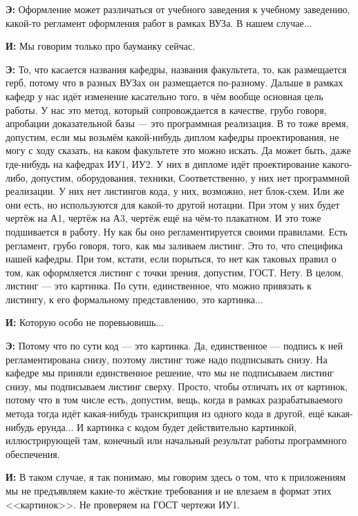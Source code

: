 \textbf{Э: }Оформление может различаться от учебного заведения к учебному заведению, какой-то регламент оформления работ в рамках ВУЗа. В нашем случае...

\textbf{И: }Мы говорим только про бауманку сейчас.

\textbf{Э: }То, что касается названия кафедры, названия факультета, то, как размещается герб, потому что в разных ВУЗах он размещается по-разному. Дальше в рамках кафедр у нас идёт изменение касательно того, в чём вообще основная цель работы. У нас это метод, который сопровождается в качестве, грубо говоря, апробации доказательной базы --- это программная реализация. В то тоже время, допустим, если мы возьмём какой-нибудь диплом кафедры проектирования, не могу с ходу сказать, на каком факультете это можно искать. Да может быть, даже где-нибудь на кафедрах ИУ1, ИУ2. У них в дипломе идёт проектирование какого-либо, допустим, оборудования, техники, Соответственно, у них нет программной реализации. У них нет листингов кода, у них, возможно, нет блок-схем. Или же они есть, но используются для какой-то другой нотации. При этом у них будет чертёж на А1, чертёж на А3, чертёж ещё на чём-то плакатном. И это тоже подшивается в работу. Ну как бы оно регламентируется своими правилами. Есть регламент, грубо говоря, того, как мы заливаем листинг. Это то, что специфика нашей кафедры. При том, кстати, если порыться, то нет как таковых правил о том, как оформляется листинг с точки зрения, допустим, ГОСТ. Нету. В целом, листинг --- это картинка. По сути, единственное, что можно привязать к листингу, к его формальному представлению, это картинка...

\textbf{И: }Которую особо не поревьювишь...

\textbf{Э: }Потому что по сути код --- это картинка. Да, единственное --- подпись к ней регламентирована снизу, поэтому листинг тоже надо подписывать снизу. На кафедре мы приняли единственное решение, что мы не подписываем листинг снизу, мы подписываем листинг сверху. Просто, чтобы отличать их от картинок, потому что в том числе есть, допустим, вещь, когда в рамках разрабатываемого метода тогда идёт какая-нибудь транскрипция из одного кода в другой, ещё какая-нибудь ерунда... И картинка с кодом будет действительно картинкой, иллюстрирующей там, конечный или начальный результат работы программного обеспечения.

\textbf{И: }В таком случае, я так понимаю, мы говорим здесь о том, что к приложениям мы не предъявляем какие-то жёсткие требования и не влезаем в формат этих <<картинок>>. Не проверяем на ГОСТ чертежи ИУ1.

